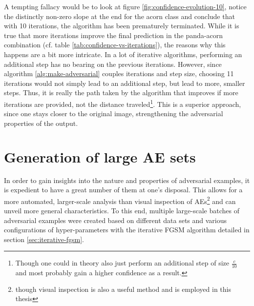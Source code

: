 \documentclass[11pt, a4paper]{article}
\begin{document}
A tempting fallacy would be to look at figure \ref{fig:confidence-evolution-10}, notice the distinctly non-zero slope at the end for the acorn class and conclude that with 10 iterations, the algorithm has been prematurely terminated. While it is true that more iterations improve the final prediction in the panda-acorn combination (cf. table \ref{tab:confidence-vs-iterations}), the reasons why this happens are a bit more intricate. In a lot of iterative algorithms, performing an additional step has no bearing on the previous iterations. However, since algorithm \ref{alg:make-adversarial} couples iterations and step size, choosing 11 iterations would not simply lead to an additional step, but lead to more, smaller steps. Thus, it is really the path taken by the algorithm that improves if more iterations are provided, not the distance traveled\footnote{Though one could in theory also just perform an additional step of size $\frac{c}{10}$ and most probably gain a higher confidence as a result.}. This is a superior approach, since one stays closer to the original image, strengthening the adversarial properties of the output.









\section{Generation of large AE sets}
\label{sec:generation-large-sets}

In order to gain insights into the nature and properties of adversarial examples, it is expedient to have a great number of them at one's disposal. This allows for a more automated, larger-scale analysis than visual inspection of AEs\footnote{though visual inspection is also a useful method and is employed in this thesis} and can unveil more general characteristics. To this end, multiple large-scale batches of adversarial examples were created based on different data sets and various configurations of hyper-parameters with the iterative FGSM algorithm detailed in section \ref{sec:iterative-fgsm}. 
\end{document}
